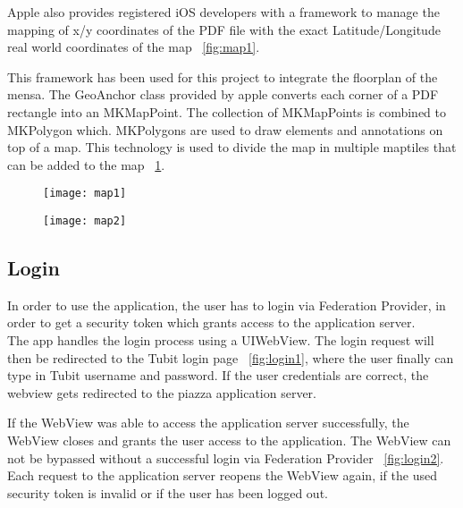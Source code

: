 Apple also provides registered iOS developers with a framework to manage the mapping of x/y coordinates of the PDF file with the exact Latitude/Longitude real world coordinates of the map 
~\ref{fig:map1}.

This framework has been used for this project to integrate the floorplan of the mensa. The GeoAnchor class provided by apple converts each corner of a PDF rectangle into an MKMapPoint. The collection of MKMapPoints is combined to MKPolygon which. MKPolygons are used to draw elements and annotations on top of a map. This technology is used to divide the map in multiple maptiles that can be added to the map ~\ref{fig:map2}.


\begin{figure}
\centering
\begin{minipage}{.5\textwidth}
  \centering
  \texttt{[image: map1]}
  \label{fig:map1}
\end{minipage}%
\begin{minipage}{.5\textwidth}
  \centering
  \texttt{[image: map2]}
  \label{fig:map2}
\end{minipage}
\end{figure}


\subsection{Login}

In order to use the application, the user has to login via Federation Provider, in order to get
a security token which grants access to the application server. \\

The app handles the login process using a UIWebView. The login request will then be redirected
to the Tubit login page ~\ref{fig:login1}, where the user finally can type in Tubit username and password.
If the user credentials are correct, the webview gets redirected to the piazza application server.

If the WebView was able to access the application server successfully, the WebView closes and grants the user access to the application. The WebView can not be bypassed without a successful login via Federation Provider ~\ref{fig:login2}. Each request to the application server reopens the WebView again, if the used security token is invalid or if the user has been logged out.



